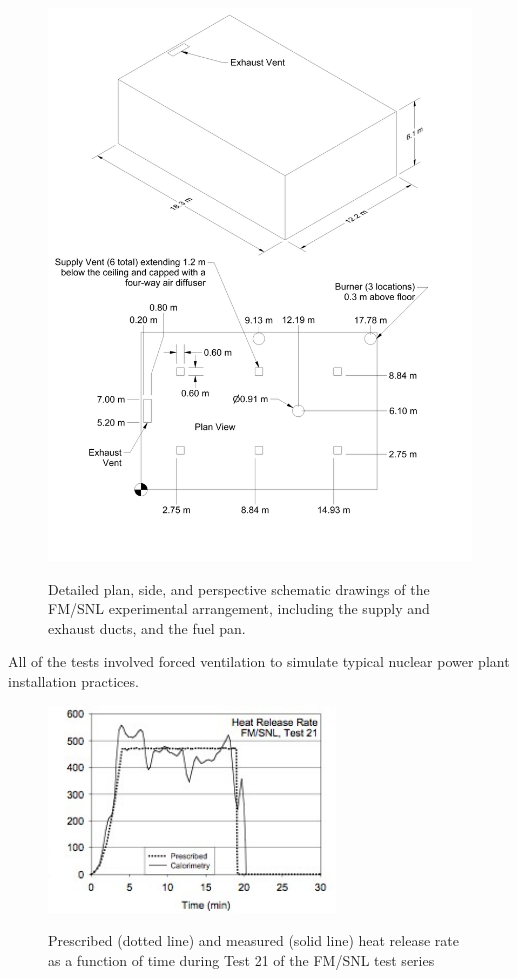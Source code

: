 \begin{figure}
\begin{center}
\includegraphics[width=6.5in]{FIGURES/FM_SNL/FM_SNL_Drawing}\\
\end{center}
\caption{Detailed plan, side, and perspective schematic drawings of the FM/SNL experimental arrangement, including the supply and exhaust ducts, and the fuel pan.}
 \label{fig:FMSNL_Detailed}
\end{figure}

All of the tests involved forced ventilation to simulate typical nuclear power plant installation practices.

\begin{figure}[\figoptions{t}]
\begin{center}
\includegraphics[width=3.0in]{FIGURES/FM_SNL/FMSNL_HRR}\\
\end{center}
\caption{Prescribed (dotted line) and measured (solid line) heat release rate as a function of time during Test 21 of the FM/SNL test series}
 \label{fig:FMSNL_HRR}
\end{figure}

